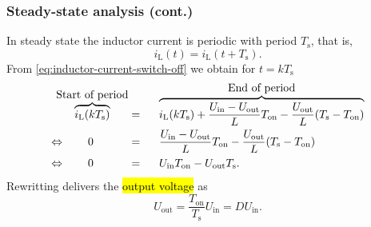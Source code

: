 \begin{frame}
    \frametitle{Steady-state analysis (cont.)}
    In steady state the inductor current is periodic with period $T_\mathrm{s}$, that is, $$i_\mathrm{L}(t) = i_\mathrm{L}(t + T_\mathrm{s}).$$
    From \eqref{eq:inductor-current-switch-off} we obtain for $t= k T_\mathrm{s}$
    \begin{equation}
        \begin{split}
        \overbrace{i_\mathrm{L}(k T_\mathrm{s})}^{\mbox{Start of period}} &= \hspace{0.5cm}  \overbrace{i_\mathrm{L}(k T_\mathrm{s}) + \frac{U_\mathrm{in}-U_\mathrm{out}}{L} T_\mathrm{on} - \frac{U_\mathrm{out}}{L} (T_\mathrm{s} - T_\mathrm{on})}^{\mbox{End of period}}\\
        \Leftrightarrow \qquad 0 \hspace{1.1cm}&= \hspace{0.5cm}\frac{U_\mathrm{in}-U_\mathrm{out}}{L} T_\mathrm{on} - \frac{U_\mathrm{out}}{L} (T_\mathrm{s} - T_\mathrm{on})\\
        \Leftrightarrow \qquad 0 \hspace{1.1cm}&= \hspace{0.5cm}U_\mathrm{in} T_\mathrm{on} - U_\mathrm{out} T_\mathrm{s}.
    \end{split}
    \end{equation}
    Rewritting delivers the \hl{output voltage} as
    \begin{equation}
        U_\mathrm{out} = \frac{T_\mathrm{on}}{T_\mathrm{s}} U_\mathrm{in} = D U_\mathrm{in}.
    \end{equation}
\end{frame}

